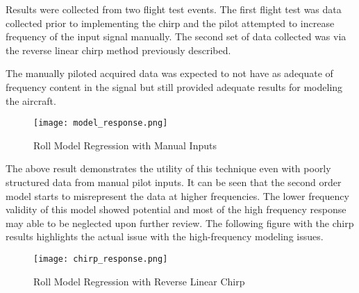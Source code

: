 Results were collected from two flight test events.  The first flight test was data collected prior to implementing the chirp and the pilot attempted to increase frequency of the input signal manually.  The second set of data collected was via the reverse linear chirp method previously described.  

The manually piloted acquired data was expected to not have as adequate of frequency content in the signal but still provided adequate results for modeling the aircraft.

\begin{figure}[!h]
 \centering
  \texttt{[image: model\_response.png]}
  \caption{Roll Model Regression with Manual Inputs}
  \label{fig:roll_model}
\end{figure}

The above result demonstrates the utility of this technique even with poorly structured data from manual pilot inputs.  It can be seen that the second order model starts to misrepresent the data at higher frequencies.  The lower frequency validity of this model showed potential and most of the high frequency response may able to be neglected upon further review.  The following figure with the chirp results highlights the actual issue with the high-frequency modeling issues.

\begin{figure}[!h]
 \centering
  \texttt{[image: chirp\_response.png]}
  \caption{Roll Model Regression with Reverse Linear Chirp}
  \label{fig:chirp_model}
\end{figure}

